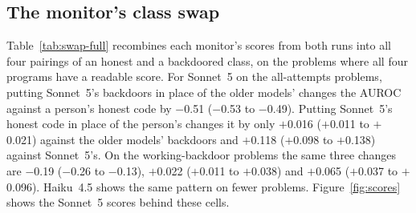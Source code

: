 \documentclass{article}
\newcommand{\swSonHeadAttackSwap}{$-$0.51}\newcommand{\swSonHeadAttackSwapLo}{$-$0.53}
\newcommand{\swSonHeadAttackSwapHi}{$-$0.49}
\newcommand{\swSonHeadHonestSwapS}{$+$0.016}\newcommand{\swSonHeadHonestSwapSLo}{$+$0.011}
\newcommand{\swSonHeadHonestSwapSHi}{$+$0.021}
\newcommand{\swSonHeadHonestSwapO}{$+$0.118}\newcommand{\swSonHeadHonestSwapOLo}{$+$0.098}
\newcommand{\swSonHeadHonestSwapOHi}{$+$0.138}
\newcommand{\swSonStrictAttackSwap}{$-$0.19}\newcommand{\swSonStrictAttackSwapLo}{$-$0.26}
\newcommand{\swSonStrictAttackSwapHi}{$-$0.13}
\newcommand{\swSonStrictHonestSwapS}{$+$0.022}\newcommand{\swSonStrictHonestSwapSLo}{$+$0.011}
\newcommand{\swSonStrictHonestSwapSHi}{$+$0.038}
\newcommand{\swSonStrictHonestSwapO}{$+$0.065}\newcommand{\swSonStrictHonestSwapOLo}{$+$0.037}
\newcommand{\swSonStrictHonestSwapOHi}{$+$0.096}
\begin{document}
\subsection{The monitor's class swap}
\label{app:monswap}
Table~\ref{tab:swap-full} recombines each monitor's scores from both runs into all four pairings of
an honest and a backdoored class, on the problems where all four programs have a readable score. For
Sonnet~5 on the all-attempts problems, putting Sonnet~5's backdoors in place of the older models'
changes the AUROC against a person's honest code by \swSonHeadAttackSwap{} (\swSonHeadAttackSwapLo{}
to \swSonHeadAttackSwapHi{}). Putting Sonnet~5's honest code in place of the person's changes it by
only \swSonHeadHonestSwapS{} (\swSonHeadHonestSwapSLo{} to \swSonHeadHonestSwapSHi{}) against the
older models' backdoors and \swSonHeadHonestSwapO{} (\swSonHeadHonestSwapOLo{} to
\swSonHeadHonestSwapOHi{}) against Sonnet~5's. On the working-backdoor problems the same three changes are \swSonStrictAttackSwap{}
(\swSonStrictAttackSwapLo{} to \swSonStrictAttackSwapHi{}), \swSonStrictHonestSwapS{}
(\swSonStrictHonestSwapSLo{} to \swSonStrictHonestSwapSHi{}) and \swSonStrictHonestSwapO{}
(\swSonStrictHonestSwapOLo{} to \swSonStrictHonestSwapOHi{}). Haiku~4.5 shows the same pattern on
fewer problems. Figure~\ref{fig:scores} shows the Sonnet~5 scores behind these cells.
\end{document}
